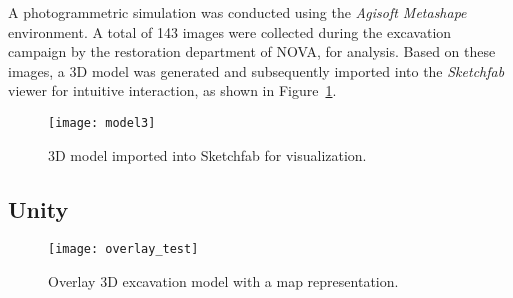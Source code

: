 A photogrammetric simulation was conducted using the \textit{Agisoft Metashape} environment. A total of 143 images were collected during the excavation campaign by the restoration department of NOVA, for analysis. 
Based on these images, a \gls{3D} model was generated and subsequently imported into the \textit{Sketchfab} viewer for intuitive interaction, as shown in Figure~\ref{fig:model3}.


\begin{figure}[h]
    \centering
    \texttt{[image: model3]}
    \caption{\gls{3D} model imported into Sketchfab for visualization.}
    \label{fig:model3}
\end{figure}


\subsection{Unity}
\label{sec:unity} 



\begin{figure}[h]
    \centering
    \texttt{[image: overlay\_test]}
    \caption{Overlay \gls{3D} excavation model with a map representation.}
    \label{fig:overlay}
\end{figure}


